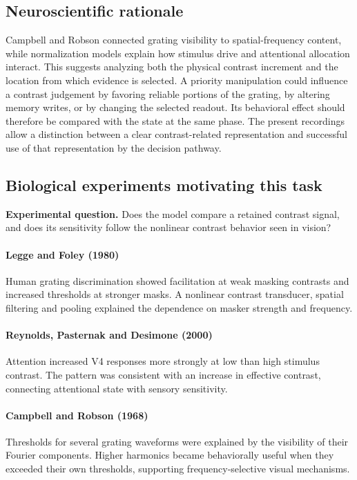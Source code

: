 \documentclass[11pt]{article}
\begin{document}
\subsection{Neuroscientific rationale}
Campbell and Robson connected grating visibility to spatial-frequency content, while normalization models explain how stimulus drive and attentional allocation interact. This suggests analyzing both the physical contrast increment and the location from which evidence is selected. A priority manipulation could influence a contrast judgement by favoring reliable portions of the grating, by altering memory writes, or by changing the selected readout. Its behavioral effect should therefore be compared with the state at the same phase. The present recordings allow a distinction between a clear contrast-related representation and successful use of that representation by the decision pathway.

\subsection{Biological experiments motivating this task}
\textbf{Experimental question.} Does the model compare a retained contrast signal, and does its sensitivity follow the nonlinear contrast behavior seen in vision?

\paragraph{Legge and Foley (1980)} Human grating discrimination showed facilitation at weak masking contrasts and increased thresholds at stronger masks. A nonlinear contrast transducer, spatial filtering and pooling explained the dependence on masker strength and frequency. \cite{bio_legge}

\paragraph{Reynolds, Pasternak and Desimone (2000)} Attention increased V4 responses more strongly at low than high stimulus contrast. The pattern was consistent with an increase in effective contrast, connecting attentional state with sensory sensitivity. \cite{bio_reynolds00}

\paragraph{Campbell and Robson (1968)} Thresholds for several grating waveforms were explained by the visibility of their Fourier components. Higher harmonics became behaviorally useful when they exceeded their own thresholds, supporting frequency-selective visual mechanisms. \cite{bio_campbell}
\end{document}
